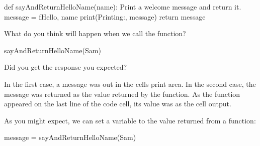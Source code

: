 \documentclass[letterpaper,10pt,english]{sphinxmanual}
\begin{document}
{{
\begin{sphinxVerbatim}[commandchars=\\\{\}]
\llap{\color{nbsphinxin}[ ]:\,\hspace{\fboxrule}\hspace{\fboxsep}}def sayAndReturnHelloName(name):
    \PYGZdq{}\PYGZdq{}\PYGZdq{}Print a welcome message and return it.\PYGZdq{}\PYGZdq{}\PYGZdq{}
    message = f\PYGZdq{}Hello, \PYGZob{}name\PYGZcb{}\PYGZdq{}
    print(\PYGZdq{}Printing:\PYGZdq{}, message)
    return message
\end{sphinxVerbatim}
}

What do you think will happen when we call the function?


{
\begin{sphinxVerbatim}[commandchars=\\\{\}]
\llap{\color{nbsphinxin}[ ]:\,\hspace{\fboxrule}\hspace{\fboxsep}}sayAndReturnHelloName(\PYGZsq{}Sam\PYGZsq{})
\end{sphinxVerbatim}
}

Did you get the response you expected?

In the first case, a message was  out in the cells print area. In the second case, the message was returned as the value returned by the function. As the function appeared on the last line of the code cell, its value was  as the cell output.

As you might expect, we can set a variable to the value returned from a function:

{
\begin{sphinxVerbatim}[commandchars=\\\{\}]
\llap{\color{nbsphinxin}[ ]:\,\hspace{\fboxrule}\hspace{\fboxsep}}message = sayAndReturnHelloName(\PYGZsq{}Sam\PYGZsq{})
\end{sphinxVerbatim}
}

}
\end{document}
